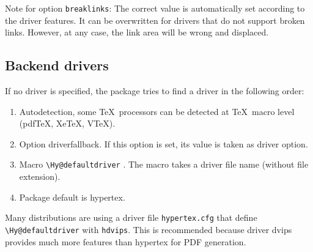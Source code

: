 \documentclass[pdftex]{article}
\newcommand*{\cs}[1]{%
  \texttt{\textbackslash #1}%
}
\begin{document}
Note for option \verb|breaklinks|:
The correct value is automatically set according to the driver features.
It can be overwritten for drivers that do not support broken links.
However, at any case, the link area will be wrong and displaced.

\subsection{Backend drivers}

If no driver is specified, the package tries to find a driver in
the following order:
\begin{enumerate}
\item Autodetection, some \TeX\ processors can be detected at \TeX\ macro
  level (pdf\TeX, Xe\TeX, V\TeX).
\item Option \textsf{driverfallback}. If this option is set, its value
  is taken as driver option.
\item Macro \cs{Hy@defaultdriver}. The macro takes a driver file
  name (without file extension).
\item Package default is \textsf{hypertex}.
\end{enumerate}
Many distributions are using a driver file \texttt{hypertex.cfg} that
define \cs{Hy@defaultdriver} with \texttt{hdvips}. This is recommended
because driver \textsf{dvips} provides much more features than
\textsf{hypertex} for PDF generation.
\end{document}
